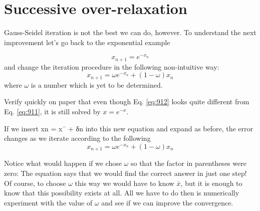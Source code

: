 \section*{Successive over-relaxation}
Gauss-Seidel iteration is not the best we can do, however. To understand the next
improvement let\rq s go back to the exponential example

\begin{equation}\label{eq:911}
x_{n+1}=e^{-x_{n}}
\end{equation}
and change the iteration procedure in the following non-intuitive way:
\begin{equation}\label{eq:912}
x_{n+1}=\omega e^{-x_{n}}+(1-\omega) x_{n}
\end{equation}
where $\omega$ is a number which is yet to be determined.
\begin{problem}\label{P9.3}Verify quickly on paper that even though Eq. \ref{eq:912} looks quite different
from Eq. \ref{eq:911}, it is still solved by $x = e^{-x}$.\end{problem}
If we insert xn = x¯ + δn into this new equation and expand as before, the error
changes as we iterate according to the following
\begin{equation}\label{eq:913}
x_{n+1}=\omega e^{-x_{n}}+(1-\omega) x_{n}
\end{equation}

Notice what would happen if we chose $\omega$ so that the factor in parentheses were
zero: The equation says that we would find the correct answer in just one step! Of
course, to choose $\omega$ this way we would have to know $\bar{x}$, but it is enough to know
that this possibility exists at all. All we have to do then is numerically experiment
with the value of $\omega$ and see if we can improve the convergence.

